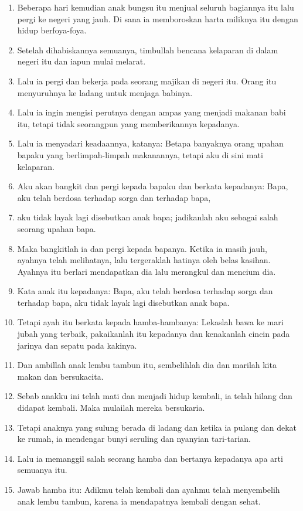 \documentclass[a5paper,headsepline,titlepage,11pt,nnormalheadings,DIVcalc]{scrbook}
\begin{document}
\begin{enumerate}
\item Beberapa hari kemudian anak bungsu itu menjual seluruh bagiannya
itu lalu pergi ke negeri yang jauh. Di sana ia memboroskan
harta miliknya itu dengan hidup berfoya-foya.
\item Setelah dihabiskannya semuanya, timbullah bencana kelaparan di
dalam negeri itu dan iapun mulai melarat.
\item Lalu ia pergi dan bekerja pada seorang majikan di negeri itu.
Orang itu menyuruhnya ke ladang untuk menjaga babinya.
\item Lalu ia ingin mengisi perutnya dengan ampas yang menjadi makanan
babi itu, tetapi tidak seorangpun yang memberikannya kepadanya.
\item Lalu ia menyadari keadaannya, katanya: Betapa banyaknya orang
upahan bapaku yang berlimpah-limpah makanannya, tetapi aku
di sini mati kelaparan.
\item Aku akan bangkit dan pergi kepada bapaku dan berkata kepadanya:
Bapa, aku telah berdosa terhadap sorga dan terhadap bapa,
\item aku tidak layak lagi disebutkan anak bapa; jadikanlah aku sebagai
salah seorang upahan bapa.
\item Maka bangkitlah ia dan pergi kepada bapanya. Ketika ia masih
jauh, ayahnya telah melihatnya, lalu tergeraklah hatinya oleh belas
kasihan. Ayahnya itu berlari mendapatkan dia lalu merangkul dan
mencium dia.
\item Kata anak itu kepadanya: Bapa, aku telah berdosa terhadap sorga
dan terhadap bapa, aku tidak layak lagi disebutkan anak bapa.
\item Tetapi ayah itu berkata kepada hamba-hambanya: Lekaslah bawa
ke mari jubah yang terbaik, pakaikanlah itu kepadanya dan
kenakanlah cincin pada jarinya dan sepatu pada kakinya.
\item Dan ambillah anak lembu tambun itu, sembelihlah dia dan marilah
kita makan dan bersukacita.
\item Sebab anakku ini telah mati dan menjadi hidup kembali, ia telah
hilang dan didapat kembali. Maka mulailah mereka bersukaria.
\item Tetapi anaknya yang sulung berada di ladang dan ketika ia pulang dan dekat ke rumah, ia mendengar bunyi seruling dan nyanyian tari-tarian.
\item Lalu ia memanggil salah seorang hamba dan bertanya kepadanya apa arti semuanya itu.
\item Jawab hamba itu: Adikmu telah kembali dan ayahmu telah menyembelih anak lembu tambun, karena ia mendapatnya kembali dengan sehat.

\end{enumerate}
\end{document}
